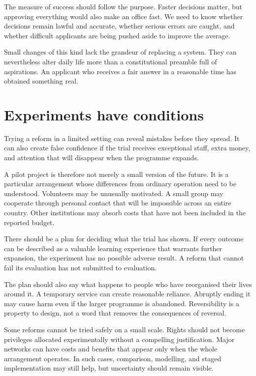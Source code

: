 \documentclass[12pt,a4paper]{book}
\begin{document}
The measure of success should follow the purpose. Faster decisions matter, but approving everything would also make an office fast. We need to know whether decisions remain lawful and accurate, whether serious errors are caught, and whether difficult applicants are being pushed aside to improve the average.

Small changes of this kind lack the grandeur of replacing a system. They can nevertheless alter daily life more than a constitutional preamble full of aspirations. An applicant who receives a fair answer in a reasonable time has obtained something real.

\section*{Experiments have conditions}

Trying a reform in a limited setting can reveal mistakes before they spread. It can also create false confidence if the trial receives exceptional staff, extra money, and attention that will disappear when the programme expands.

A pilot project is therefore not merely a small version of the future. It is a particular arrangement whose differences from ordinary operation need to be understood. Volunteers may be unusually motivated. A small group may cooperate through personal contact that will be impossible across an entire country. Other institutions may absorb costs that have not been included in the reported budget.

There should be a plan for deciding what the trial has shown. If every outcome can be described as a valuable learning experience that warrants further expansion, the experiment has no possible adverse result. A reform that cannot fail its evaluation has not submitted to evaluation.

The plan should also say what happens to people who have reorganised their lives around it. A temporary service can create reasonable reliance. Abruptly ending it may cause harm even if the larger programme is abandoned. Reversibility is a property to design, not a word that removes the consequences of reversal.

Some reforms cannot be tried safely on a small scale. Rights should not become privileges allocated experimentally without a compelling justification. Major networks can have costs and benefits that appear only when the whole arrangement operates. In such cases, comparison, modelling, and staged implementation may still help, but uncertainty should remain visible.
\end{document}
